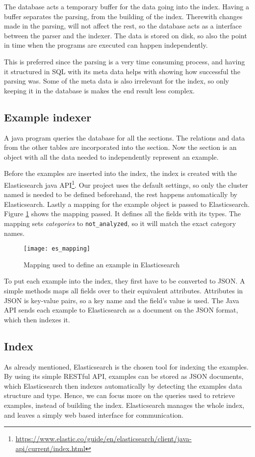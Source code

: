 The database acts a temporary buffer for the data going into the index. Having a buffer separates the parsing, from the building of the index. Therewith changes made in the parsing, will not affect the rest, so the database acts as a interface between the parser and the indexer. The data is stored on disk, so also the point in time when the programs are executed can happen independently.

This is preferred since the parsing is a very time consuming process, and having it structured in SQL with its meta data helps with showing how successful the parsing was. Some of the meta data is also irrelevant for the index, so only keeping it in the database is makes the end result less complex.


\subsection{Example indexer}
A java program queries the database for all the sections. The relations and data from the other tables are incorporated into the section. Now the section is an object with all the data needed to independently represent an example.

Before the examples are inserted into the index, the index is created with the Elasticsearch java API\footnote{\url{https://www.elastic.co/guide/en/elasticsearch/client/java-api/current/index.html}}. Our project uses the default settings, so only the cluster named is needed to be defined beforehand, the rest happens automatically by Elasticsearch. Lastly a mapping for the example object is passed to Elasticsearch. Figure \ref{fig:es_mapping} shows the mapping passed. It defines all the fields with its types. The mapping sets \textit{categories} to \texttt{not\_analyzed}, so it will match the exact category names.

\begin{figure}[h] 
\caption{Mapping used to define an example in Elasticsearch}
\centering
\texttt{[image: es\_mapping]}
\label{fig:es_mapping}
\end{figure}

To put each example into the index, they first have to be converted to JSON. A simple methods maps all fields over to their equivalent attributes. Attributes in JSON is key-value pairs, so a key name and the field's value is used. The Java API sends each example to Elasticsearch as a document on the JSON format, which then indexes it.

\subsection{Index}
As already mentioned, Elasticsearch is the chosen tool for indexing the examples. By using its simple RESTful API, examples can be stored as JSON documents, which Elasticsearch then indexes automatically by detecting the examples data structure and type. Hence, we can focus more on the queries used to retrieve examples, instead of building the index. Elasticsearch manages the whole index, and leaves a simply web based interface for communication.

